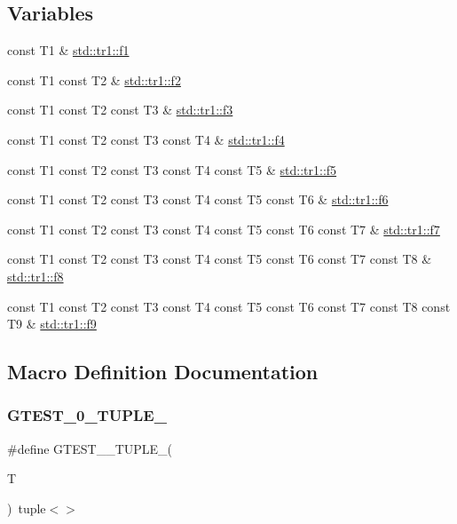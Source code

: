 \subsection*{Variables}
\begin{DoxyCompactItemize}
\item 
const T1 \& \mbox{\hyperlink{namespacestd_1_1tr1_a9c0fa65b105f8e2f58ba59ecf75fd000}{std\+::tr1\+::f1}}
\item 
const T1 const T2 \& \mbox{\hyperlink{namespacestd_1_1tr1_a87dd9e009868361317f587126dba63d4}{std\+::tr1\+::f2}}
\item 
const T1 const T2 const T3 \& \mbox{\hyperlink{namespacestd_1_1tr1_a0f7c3b47d27d42d82d1a333ea420ce4e}{std\+::tr1\+::f3}}
\item 
const T1 const T2 const T3 const T4 \& \mbox{\hyperlink{namespacestd_1_1tr1_adc796e02b7385d526aff708189564f67}{std\+::tr1\+::f4}}
\item 
const T1 const T2 const T3 const T4 const T5 \& \mbox{\hyperlink{namespacestd_1_1tr1_a9c1eb66b2b2fa321942af95405232a0d}{std\+::tr1\+::f5}}
\item 
const T1 const T2 const T3 const T4 const T5 const T6 \& \mbox{\hyperlink{namespacestd_1_1tr1_a6b62f32e1e3e21bceb94eb46c4cbfd56}{std\+::tr1\+::f6}}
\item 
const T1 const T2 const T3 const T4 const T5 const T6 const T7 \& \mbox{\hyperlink{namespacestd_1_1tr1_a2185f3a1c07f2df072c39cb91ffa89a4}{std\+::tr1\+::f7}}
\item 
const T1 const T2 const T3 const T4 const T5 const T6 const T7 const T8 \& \mbox{\hyperlink{namespacestd_1_1tr1_ab998afa41cea8d6d26d7e4288b0bf974}{std\+::tr1\+::f8}}
\item 
const T1 const T2 const T3 const T4 const T5 const T6 const T7 const T8 const T9 \& \mbox{\hyperlink{namespacestd_1_1tr1_a216d2c7cdfaaf415caba2f88e2c34413}{std\+::tr1\+::f9}}
\end{DoxyCompactItemize}


\subsection{Macro Definition Documentation}
\mbox{\label{gtest-tuple_8h_acecddf48fa29ec4b0199d5a467e89778}} 
\subsubsection{\texorpdfstring{GTEST\_0\_TUPLE\_}{GTEST\_0\_TUPLE\_}}
{\footnotesize\ttfamily \#define G\+T\+E\+S\+T\+\_\+\_\+\+T\+U\+P\+L\+E\+\_\+(\begin{DoxyParamCaption}\item[{}]{T }\end{DoxyParamCaption})~tuple$<$$>$}

